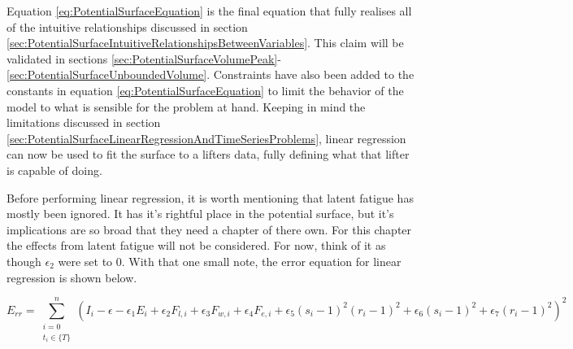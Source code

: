 %
%
%
%

Equation \ref{eq:PotentialSurfaceEquation} is the final equation that fully realises all of the intuitive relationships discussed in section \ref{sec:PotentialSurfaceIntuitiveRelationshipsBetweenVariables}. This claim will be validated in sections \ref{sec:PotentialSurfaceVolumePeak}-\ref{sec:PotentialSurfaceUnboundedVolume}. Constraints have also been added to the constants in equation \ref{eq:PotentialSurfaceEquation} to limit the behavior of the model to what is sensible for the problem at hand. Keeping in mind the limitations discussed in section \ref{sec:PotentialSurfaceLinearRegressionAndTimeSeriesProblems}, linear regression can now be used to fit the surface to a lifters data, fully defining what that lifter is capable of doing. 

Before performing linear regression, it is worth mentioning that latent fatigue has mostly been ignored. It has it's rightful place in the potential surface, but it's implications are so broad that they need a chapter of there own. For this chapter the effects from latent fatigue will not be considered. For now, think of it as though $\epsilon_2$ were set to $0$.  With that one small note, the error equation for linear regression is shown below.

\begin{equation*}
    E_{rr}=\sum_{
            \substack{i=0\\ t_i\in \{ T \}}
        }^n \left(
        I_i
        -\epsilon
        -\epsilon_1 E_i
        +\epsilon_2 F_{l,i}
        +\epsilon_3 F_{w,i}
        +\epsilon_4 F_{e,i}
        +\epsilon_5 (s_i-1)^2(r_i-1)^2
        +\epsilon_6 (s_i-1)^2
        +\epsilon_7 (r_i-1)^2
    \right)^2
\end{equation*}

